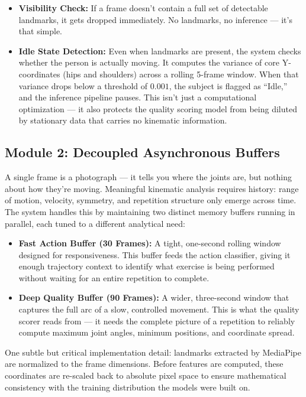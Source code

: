 \documentclass[10pt, twocolumn, a4paper]{article}
\begin{document}
\begin{itemize}
    \item \textbf{Visibility Check:} If a frame doesn't contain a full set of detectable landmarks, it gets dropped immediately. No landmarks, no inference — it's that simple.
    \item \textbf{Idle State Detection:} Even when landmarks are present, the system checks whether the person is actually moving. It computes the variance of core Y-coordinates (hips and shoulders) across a rolling 5-frame window. When that variance drops below a threshold of $0.001$, the subject is flagged as ``Idle,'' and the inference pipeline pauses. This isn't just a computational optimization — it also protects the quality scoring model from being diluted by stationary data that carries no kinematic information.
\end{itemize}

\subsection{Module 2: Decoupled Asynchronous Buffers}
A single frame is a photograph — it tells you where the joints are, but nothing about how they're moving. Meaningful kinematic analysis requires history: range of motion, velocity, symmetry, and repetition structure only emerge across time. The system handles this by maintaining two distinct memory buffers running in parallel, each tuned to a different analytical need:

\begin{itemize}
    \item \textbf{Fast Action Buffer (30 Frames):} A tight, one-second rolling window designed for responsiveness. This buffer feeds the action classifier, giving it enough trajectory context to identify what exercise is being performed without waiting for an entire repetition to complete.
    \item \textbf{Deep Quality Buffer (90 Frames):} A wider, three-second window that captures the full arc of a slow, controlled movement. This is what the quality scorer reads from — it needs the complete picture of a repetition to reliably compute maximum joint angles, minimum positions, and coordinate spread.
\end{itemize}

One subtle but critical implementation detail: landmarks extracted by MediaPipe are normalized to the frame dimensions. Before features are computed, these coordinates are re-scaled back to absolute pixel space to ensure mathematical consistency with the training distribution the models were built on.
\end{document}
